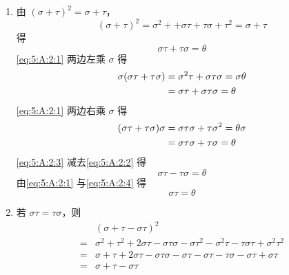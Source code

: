\begin{exercise}
\begin{exgroup}
\begin{answer}
\begin{enumerate}
                \item 由 $ (\sigma + \tau)^2 = \sigma + \tau $，
                      \[ (\sigma + \tau)^2 = \sigma^2 + + \sigma \tau + \tau \sigma + \tau^2 = \sigma + \tau \]
                      得
                      \begin{equation} \label{eq:5:A:2:1}
                          \sigma \tau + \tau \sigma = \theta
                      \end{equation}
                      \autoref{eq:5:A:2:1} 两边左乘 $ \sigma $ 得
                      \begin{align}
                          \sigma(\sigma \tau + \tau \sigma) & = \sigma^2 \tau + \sigma \tau \sigma = \sigma \theta \notag    \\
                                                            & = \sigma \tau + \sigma \tau \sigma = \theta \label{eq:5:A:2:2}
                      \end{align}
                      \autoref{eq:5:A:2:1} 两边右乘 $ \sigma $ 得
                      \begin{align}
                          (\sigma \tau + \tau \sigma)\sigma & = \sigma \tau \sigma + \tau \sigma^2 = \theta \sigma \notag    \\
                                                            & = \sigma \tau \sigma + \tau \sigma = \theta \label{eq:5:A:2:3}
                      \end{align}
                      \autoref{eq:5:A:2:3} 减去\autoref{eq:5:A:2:2} 得
                      \begin{equation}
                          \sigma \tau - \tau \sigma = \theta \label{eq:5:A:2:4}
                      \end{equation}
                      由\autoref{eq:5:A:2:1} 与\autoref{eq:5:A:2:4} 得
                      \[ \sigma \tau = \theta \]

                \item 若 $ \sigma \tau = \tau \sigma $，则
                      \begin{align*}
                              & (\sigma + \tau - \sigma \tau)^2                                                                                             \\
                          ={} & \sigma^2 + \tau^2 + 2 \sigma \tau - \sigma \tau \sigma - \sigma \tau^2 - \sigma^2 \tau - \tau \sigma \tau + \sigma^2 \tau^2 \\
                          ={} & \sigma + \tau + 2 \sigma \tau - \sigma \tau \sigma - \sigma \tau - \sigma \tau - \tau \sigma - \sigma \tau + \sigma \tau    \\
                          ={} & \sigma + \tau - \sigma \tau
                      \end{align*}
            \end{enumerate}
        \end{answer}


\end{exgroup}
\end{exercise}
